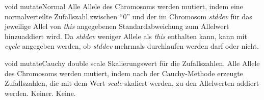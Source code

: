 \documentclass{report}
\begin{document}
\newpage

\setNormalInstance
\setCorrectWidthThree{8pt}
\printMethodWithParamsSaved
{void}
{}
{mutateNormal}
{Alle Allele des Chromosoms werden mutiert, indem eine normalverteilte
    Zufallszahl zwischen ``0'' und der im Chromosom {\em stddev} f\"ur das jeweilige
    Allel von {\em this} angegebenen Standardabweichung zum Allelwert hinzuaddiert wird.
    Da {\em stddev} weniger Allele als {\em this} enthalten kann, kann mit {\em cycle} angegeben 
    werden, ob {\em stddev} mehrmals durchlaufen werden darf oder nicht.}
{}
\setCorrectWidthThree{4pt}

\vspace{4ex}

\setNormalInstance
\printMethodWithOneParam
{void}
{mutateCauchy}
{double}
{scale}
{Skalierungswert f\"ur die Zufallszahlen.}
{Alle Allele des Chromosoms werden mutiert, indem nach der Cauchy-Methode
    erzeugte Zufallszahlen, die mit dem Wert {\em scale} skaliert werden, 
    zu den
    Allelwerten addiert werden.}
{Keiner.}
{Keine.}

\newpage
\end{document}
